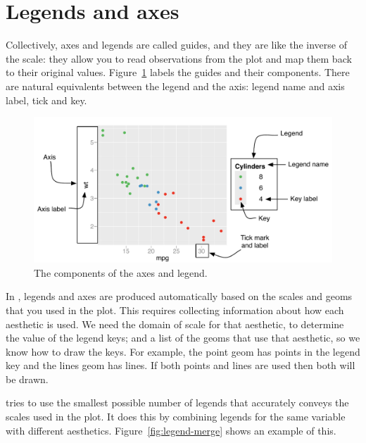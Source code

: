 \section{Legends and axes}
\label{sec:guides}

Collectively, axes and legends are called guides, and they are like the inverse of the scale: they allow you to read observations from the plot and map them back to their original values.  Figure~\ref{fig:labelled-guides} labels the guides and their components.  There are natural equivalents between the legend and the axis: legend name and axis label, tick and key.

\begin{figure}[htbp]
  \centering
  \includegraphics[width=\textwidth]{scale-guides}
  
  \caption{The components of the axes and legend.}
  \label{fig:labelled-guides}
\end{figure}

In \ggplot, legends and axes are produced automatically based on the scales and geoms that you used in the plot. This requires collecting information about how each aesthetic is used. We need the domain of scale for that aesthetic, to determine the value of the legend keys; and a list of the geoms that use that aesthetic, so we know how to draw the keys. For example, the point geom has points in the legend key and the lines geom has lines. If both points and lines are used then both will be drawn.

\ggplot tries to use the smallest possible number of legends that accurately conveys the scales used in the plot.  It does this by combining legends for the same variable with different aesthetics.  Figure~\ref{fig:legend-merge} shows an example of this.  


